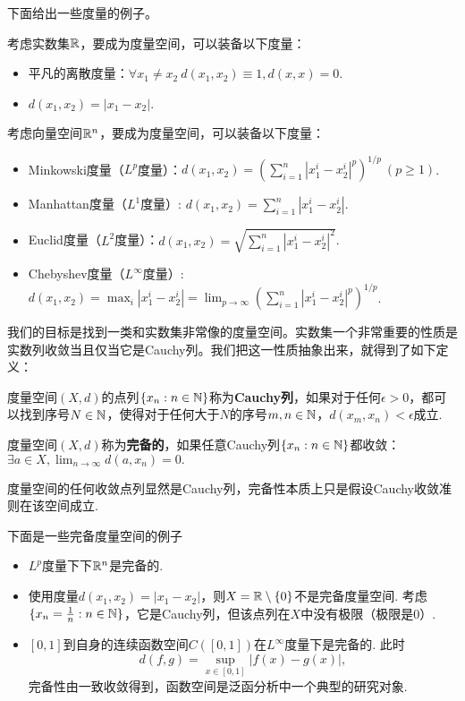 下面给出一些度量的例子。
\begin{example}
    考虑实数集$\mathbb{R}$，要成为度量空间，可以装备以下度量：
    \begin{itemize}
            \item 平凡的离散度量：$\forall x_1\neq x_2\ d(x_1,x_2)\equiv 1, d(x,x)=0$. 
            \item $d(x_1,x_2)=|x_1-x_2|$. 
        \end{itemize}
        考虑向量空间$\mathbb{R}^n$，要成为度量空间，可以装备以下度量：
        \begin{itemize}
            \item Minkowski度量（$L^p$度量）：$d(x_1,x_2)=(\sum_{i=1}^n|x_1^i-x_2^i|^p)^{1/p}\ (p\ge 1)$. 
            \item Manhattan度量（$L^1$度量）: $d(x_1,x_2)=\sum_{i=1}^n|x_1^i-x_2^i|$. 
            \item Euclid度量（$L^2$度量）：$d(x_1,x_2)=\sqrt{\sum_{i=1}^n|x_1^i-x_2^i|^2}$. 
            \item Chebyshev度量（$L^\infty$度量）: $d(x_1,x_2)=\max_i|x_1^i-x_2^i|=\lim_{p\to\infty}(\sum_{i=1}^n|x_1^i-x_2^i|^p)^{1/p}$. 
        \end{itemize}
\end{example}

我们的目标是找到一类和实数集非常像的度量空间。实数集一个非常重要的性质是实数列收敛当且仅当它是Cauchy列。我们把这一性质抽象出来，就得到了如下定义：

\begin{example}
    度量空间$(X,d)$的点列$\{x_n:n\in \mathbb{N}\}$称为\textbf{Cauchy列}，如果对于任何$\epsilon>0$，都可以找到序号$N\in\mathbb{N}$，使得对于任何大于$N$的序号$m,n\in\mathbb{N}$，$d(x_m,x_n)<\epsilon$成立.

    度量空间$(X,d)$称为\textbf{完备的}，如果任意Cauchy列$\{x_n:n\in \mathbb{N}\}$都收敛：$\exists a\in X, \lim_{n\to\infty}d(a,x_n)=0.$
\end{example}
度量空间的任何收敛点列显然是Cauchy列，完备性本质上只是假设Cauchy收敛准则在该空间成立.

下面是一些完备度量空间的例子
\begin{example}
\begin{itemize}
\item $L^p$度量下下$\mathbb{R}^n$是完备的.
\item 使用度量$d(x_1,x_2)=|x_1-x_2|$，则$X=\mathbb{R}\setminus\{0\}$不是完备度量空间. 考虑$\{x_n=\frac1n:n\in\mathbb{N}\}$，它是Cauchy列，但该点列在$X$中没有极限（极限是$0$）.

\item $[0,1]$到自身的连续函数空间$C([0,1])$在$L^\infty$度量下是完备的.
此时
\[d(f,g)=\sup_{x\in[0,1]}|f(x)-g(x)|,\]
完备性由一致收敛得到，函数空间是泛函分析中一个典型的研究对象.
\end{itemize}
\end{example}

